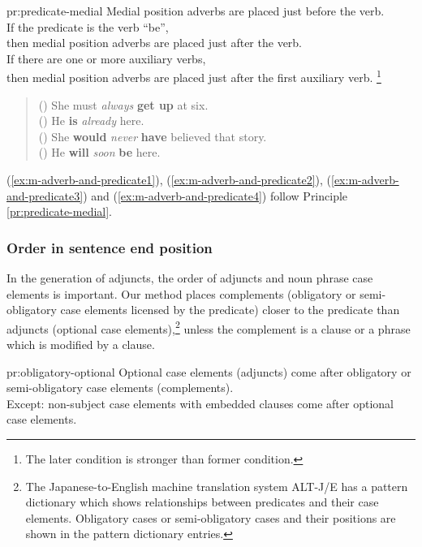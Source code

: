 \begin{pr}{pr:predicate-medial}{}
    Medial position adverbs are placed just before the verb. \\
    If the predicate is the verb ``be'', \\
    then medial position adverbs are placed just after the verb. \\
    If there are one or more auxiliary verbs, \\
    then medial position adverbs are placed just after the first auxiliary 
    verb. \footnote{The later condition is stronger than former condition.}
\end{pr}

\begin{quote}
 \small
 ()
 She must {\em always} {\bf get up} at six. \\
 ()
 He {\bf is} {\em already} here. \\
 ()
 She {\bf would} {\em never} {\bf have} believed that story. \\
 ()
 He {\bf will} {\em soon} {\bf be} here. 
\end{quote}

(\ref{ex:m-adverb-and-predicate1}), (\ref{ex:m-adverb-and-predicate2}), 
(\ref{ex:m-adverb-and-predicate3}) and (\ref{ex:m-adverb-and-predicate4}) 
follow Principle \ref{pr:predicate-medial}. 

\subsubsection{Order in sentence end position}

In the generation of adjuncts, the order of adjuncts and noun phrase
case elements is important. Our method places complements (obligatory
or semi-obligatory case elements licensed by the predicate) closer to
the predicate than adjuncts (optional case elements),\footnote{The
Japanese-to-English machine translation system ALT-J/E has a pattern
dictionary which shows relationships between predicates and their case
elements.  Obligatory cases or semi-obligatory cases and their
positions are shown in the pattern dictionary entries.}  unless the
complement is a clause or a phrase which is modified by a clause.

\begin{pr}{pr:obligatory-optional}{}
    Optional case elements (adjuncts) come after 
    obligatory or semi-obligatory case elements (complements).\\
    Except:  non-subject case elements with embedded 
    clauses come after optional case elements.
\end{pr}


